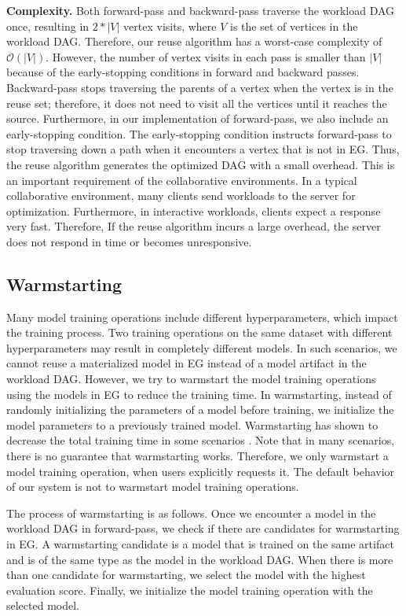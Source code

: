 \textbf{Complexity.} 
Both forward-pass and backward-pass traverse the workload DAG once, resulting in $2*|V|$ vertex visits, where $V$ is the set of vertices in the workload DAG.
Therefore, our reuse algorithm has a worst-case complexity of $\mathcal{O}(|V|)$.
However, the number of vertex visits in each pass is smaller than $|V|$ because of the early-stopping conditions in forward and backward passes.
Backward-pass stops traversing the parents of a vertex when the vertex is in the reuse set; therefore, it does not need to visit all the vertices until it reaches the source.
Furthermore, in our implementation of forward-pass, we also include an early-stopping condition.
The early-stopping condition instructs forward-pass to stop traversing down a path when it encounters a vertex that is not in EG.
Thus, the reuse algorithm generates the optimized DAG with a small overhead.
This is an important requirement of the collaborative environments.
In a typical collaborative environment, many clients send workloads to the server for optimization.
Furthermore, in interactive workloads, clients expect a response very fast.
Therefore, If the reuse algorithm incurs a large overhead, the server does not respond in time or becomes unresponsive.
\subsection{Warmstarting}
Many model training operations include different hyperparameters, which impact the training process.
Two training operations on the same dataset with different hyperparameters may result in completely different models.
In such scenarios, we cannot reuse a materialized model in EG instead of a model artifact in the workload DAG.
However, we try to warmstart the model training operations using the models in EG to reduce the training time.
In warmstarting, instead of randomly initializing the parameters of a model before training, we initialize the model parameters to a previously trained model.
Warmstarting has shown to decrease the total training time in some scenarios \cite{baylor2017tfx}.
Note that in many scenarios, there is no guarantee that warmstarting works.
Therefore, we only warmstart a model training operation, when users explicitly requests it.
The default behavior of our system is not to warmstart model training operations.

The process of warmstarting is as follows.
Once we encounter a model in the workload DAG in forward-pass, we check if there are candidates for warmstarting in EG.
A warmstarting candidate is a model that is trained on the same artifact and is of the same type as the model in the workload DAG.
When there is more than one candidate for warmstarting, we select the model with the highest evaluation score.
Finally, we initialize the model training operation with the selected model.